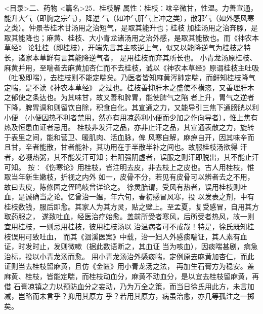 \documentclass[a4paper,12pt,UTF8,twoside]{ctexbook}
\begin{document}
<目录>二、药物
<篇名>25．桂枝解
属性：桂枝∶味辛微甘，性温。力善宣通，能升大气（即胸之宗气），降逆 
气（如冲气肝气上冲之类），散邪气（如外感风寒之类）。仲景苓桂术甘汤用之治短气，是取其能升也；桂枝 
加桂汤用之治奔豚，是取其能降也；麻黄、桂枝、大小青龙诸汤用之治外感，是取其能散也。而《神农本草经》 
论牡桂（即桂枝），开端先言其主咳逆上气，似又以能降逆气为桂枝之特长，诸家本草鲜有言其能降逆气者， 
是用桂枝而弃其所长也。 
小青龙汤原桂枝、麻黄并用，至喘者去麻黄加杏仁而不去桂枝，诚以《神农本草经》原谓桂枝主吐吸 
（吐吸即喘），去桂枝则不能定喘矣。乃医者皆知麻黄泻肺定喘，而鲜知桂枝降气定喘，是不读《神农本草经》 
之过也。桂枝善抑肝木之盛使不横恣，又善理肝木之郁使之条达也。为其味甘，故又善和脾胃，能使脾气之陷 
者上升，胃气之逆者下降，脾胃调和则留饮自除，积食自化。其宣通之力，又能导引三焦下通膀胱以利小便 
（小便因热不利者禁用，然亦有用凉药利小便而少加之作向导者），惟上焦有热及恒患血证者忌用。 
桂枝非发汗之品，亦非止汗之品，其宣通表散之力，旋转于表里之间，能和营卫、暖肌肉、活血脉，俾 
风寒自解，麻痹自开，因其味辛而且甘，辛者能散，甘者能补，其功用在于半散半补之间也。故服桂枝汤欲得 
汗者，必啜热粥，其不能发汗可知；若阳强阴虚者，误服之则汗即脱出，其不能止汗可知。 
按∶《伤寒论》用桂枝，皆注明去皮，非去枝上之皮也。古人用桂枝，惟取当年新生嫩枝，折视之内外 
如一，皮骨不分，若见有皮骨可以辨者去之不用，故曰去皮，陈修园之侄鸣岐曾详论之。 
徐灵胎谓，受风有热者，误用桂枝则吐血，是诚确当之论。忆曾治一媪，年六旬，春初感冒风寒，投 
以发表之剂，中有桂枝数钱，服后即愈。其家人为其方灵，贴之壁上。至孟夏，复受感冒，自用其方取药服之， 
遂致吐血，经医治疗始愈。盖前所受者寒风，后所受者热风，故一则宜用桂枝，一则忌用桂枝，彼用桂枝汤以 
治温病者可不戒哉！特是，徐氏既知桂枝误用可致吐血， 
而其《洄溪医案》中载，治一妇人外感痰喘证，其人素有血证，时发时止，发则微嗽（据此数语断之，其血证 
当为咳血），因痰喘甚剧，病急治标，投以小青龙汤而愈。 
用小青龙汤治外感痰喘，定例原去麻黄加杏仁，而此证则当去桂枝留麻黄，且仿《金匮》用小青龙汤之法， 
再加生石膏方为稳安。盖麻黄、桂枝，皆能定喘，而桂枝动血分，麻黄不动血分，是以宜去桂枝留麻黄，再借 
石膏凉镇之力以预防血分之妄动，乃为万全之策，而当日徐氏用此方，未言加减，岂略而未言乎？抑用其原方 
乎？若用其原方，病虽治愈，亦几等孤注之一掷矣。 
\end{document}
